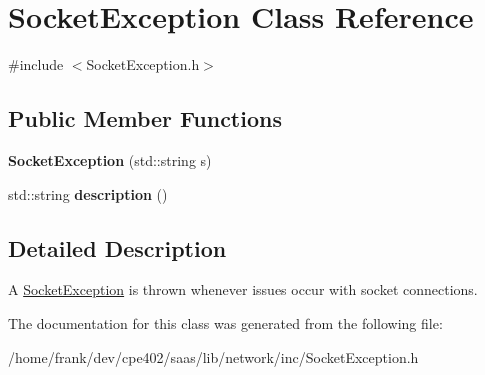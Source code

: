 \hypertarget{class_socket_exception}{}\section{Socket\+Exception Class Reference}
\label{class_socket_exception}


{\ttfamily \#include $<$Socket\+Exception.\+h$>$}

\subsection*{Public Member Functions}
\begin{DoxyCompactItemize}
\item 
\hypertarget{class_socket_exception_a09ddb0c061c40fcb527ff89a2e803342}{}{\bfseries Socket\+Exception} (std\+::string s)\label{class_socket_exception_a09ddb0c061c40fcb527ff89a2e803342}

\item 
\hypertarget{class_socket_exception_ad7920caebddc99b6bbb7dbede569fa18}{}std\+::string {\bfseries description} ()\label{class_socket_exception_ad7920caebddc99b6bbb7dbede569fa18}

\end{DoxyCompactItemize}


\subsection{Detailed Description}
A \hyperlink{class_socket_exception}{Socket\+Exception} is thrown whenever issues occur with socket connections. 

The documentation for this class was generated from the following file\+:\begin{DoxyCompactItemize}
\item 
/home/frank/dev/cpe402/saas/lib/network/inc/Socket\+Exception.\+h\end{DoxyCompactItemize}
